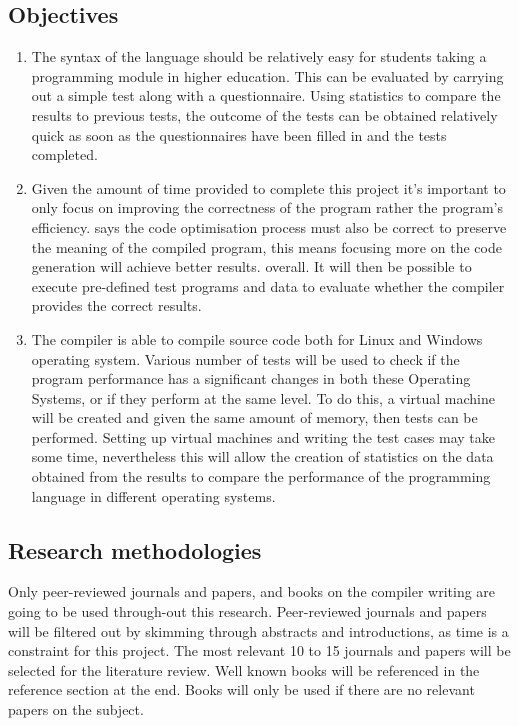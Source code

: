 \documentclass[a4paper]{article}
\begin{document}
\subsection{Objectives}
\begin{enumerate}
	\item The syntax of the language should be relatively easy for students taking a programming module in higher education. This can be evaluated by carrying out a simple test along with a questionnaire. Using statistics to compare the results to previous tests, the outcome of the tests can be obtained relatively quick as soon as the questionnaires have been filled in and the tests completed.
	\item Given the amount of time provided to complete this project it's important to only focus on improving the correctness of the program rather the program's efficiency. \textcite{AhoLamSethiUllman2006} says the code optimisation process must also be correct to preserve the meaning of the compiled program, this means focusing more on the code generation will achieve better results.  overall. It will then be possible to execute pre-defined test programs and data to evaluate whether the compiler provides the correct results.
	\item The compiler is able to compile source code both for Linux and Windows operating system. Various number of tests will be used to check if the program performance has a significant changes in both these Operating Systems, or if they perform at the same level. To do this, a virtual machine will be created and given the same amount of memory, then tests can be performed. Setting up virtual machines and writing the test cases may take some time, nevertheless this will allow the creation of statistics on the data obtained from the results to compare the performance of the programming language in different operating systems.
\end{enumerate}

\subsection{Research methodologies}
Only peer-reviewed journals and papers, and books on the compiler writing are going to be used through-out this research. Peer-reviewed journals and papers will be filtered out by skimming through abstracts and introductions, as time is a constraint for this project. The most relevant 10 to 15 journals and papers will be selected for the literature review. Well known books will be referenced in the reference section at the end. Books will only be used if there are no relevant papers on the subject.
\end{document}
